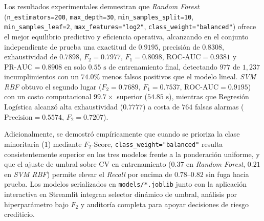 \documentclass[conference]{IEEEtran}
\begin{document}
Los resultados experimentales demuestran que \textit{Random Forest} (\texttt{n\_estimators=200}, \texttt{max\_depth=30}, \texttt{min\_samples\_split=10}, \texttt{min\_samples\_leaf=2}, \texttt{max\_features="log2"}, \texttt{class\_weight="balanced"}) ofrece el mejor equilibrio predictivo y eficiencia operativa, alcanzando en el conjunto independiente de prueba una exactitud de $0.9195$, precisión de $0.8308$, exhaustividad de $0.7898$, $F_2=0.7977$, $F_1=0.8098$, $\text{ROC-AUC}=0.9381$ y $\text{PR-AUC}=0.8908$ en solo $0.55\text{ s}$ de entrenamiento final, detectando $977$ de $1{,}237$ incumplimientos con un $74.0\%$ menos falsos positivos que el modelo lineal. \textit{SVM RBF} obtuvo el segundo lugar ($F_2=0.7689$, $F_1=0.7537$, $\text{ROC-AUC}=0.9195$) con un costo computacional $99.7\times$ superior ($54.85\text{ s}$), mientras que Regresión Logística alcanzó alta exhaustividad ($0.7777$) a costa de $764$ falsas alarmas ($\text{Precision}=0.5574$, $F_2=0.7207$).

Adicionalmente, se demostró empíricamente que cuando se prioriza la clase minoritaria ($1$) mediante $F_2$-Score, \texttt{class\_weight="balanced"} resulta consistentemente superior en los tres modelos frente a la ponderación uniforme, y que el ajuste de umbral sobre CV en entrenamiento ($0.37$ en \textit{Random Forest}, $0.21$ en \textit{SVM RBF}) permite elevar el \textit{Recall} por encima de $0.78$--$0.82$ sin fuga hacia prueba. Los modelos serializados en \texttt{models/*.joblib} junto con la aplicación interactiva en Streamlit integran selector dinámico de umbral, análisis por hiperparámetro bajo $F_2$ y auditoría completa para apoyar decisiones de riesgo crediticio.



\end{document}
